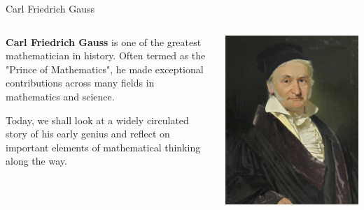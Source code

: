 \documentclass[10pt,xcolor={table,dvipsnames},t]{beamer}
\begin{document}
\begin{frame}{Carl Friedrich Gauss}
  \begin{columns}
    \begin{column}[T]{0.7\textwidth}
    \setlength{\partopsep}{0pt}
    \textbf{Carl Friedrich Gauss} is one of the greatest mathematician in history. Often termed as the "Prince of Mathematics", he made exceptional contributions across many fields in mathematics and science.

    \vspace{0.6cm}
    Today, we shall look at a widely circulated story of his early genius and reflect on important elements of mathematical thinking along the way.
    \end{column}
    \begin{column}[T]{0.3\textwidth}
        \includegraphics[width=\textwidth]{img/gauss.jpg}

    \end{column}
  \end{columns}
\end{frame}
\end{document}
